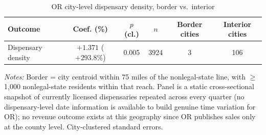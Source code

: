 \begin{table}[htbp]
\centering
\caption{OR city-level dispensary density, border vs.\ interior}
\label{tab:or_city_density}
\footnotesize
\begin{tabular}{lccccc}
\toprule
Outcome & Coef. (\%) & $p$ (cl.) & $n$ & Border cities & Interior cities \\
\midrule
Dispensary density & $+1.371$ ($+293.8\%$) & 0.005 & 3924 & 3 & 106 \\
\bottomrule
\end{tabular}
\begin{minipage}{0.95\textwidth}
\vspace{0.3em}
\footnotesize
\textit{Notes:} Border = city centroid within 75 miles of the nonlegal-state line, with $\geq$1,000
nonlegal-state residents within that reach. Panel is a static cross-sectional snapshot of currently
licensed dispensaries repeated across every quarter
(no dispensary-level date information is available to build genuine time variation for OR); no revenue outcome exists at this geography since OR publishes sales
only at the county level. City-clustered standard errors.
\end{minipage}
\end{table}
